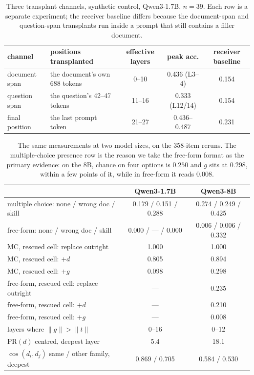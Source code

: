 \documentclass{article}
\newcommand{\dvec}{\ensuremath{d}}
\newcommand{\gvec}{\ensuremath{g}}
\newcommand{\tvec}{\ensuremath{t}}
\begin{document}
\begin{table}[t]
\caption{Three transplant channels, synthetic control, Qwen3-1.7B, $n=39$.
Each row is a separate experiment; the receiver baseline differs because the
document-span and question-span transplants run inside a prompt that still
contains a filler document.}
\label{tab:windows}
\centering
\small
\begin{tabular}{llccc}
\toprule
channel & positions transplanted & effective layers & peak acc. & receiver baseline \\
\midrule
document span & the document's own 688 tokens & 0--10 & 0.436 (L3--4) & 0.154 \\
question span & the question's 42--47 tokens  & 11--16 & 0.333 (L12/14) & 0.154 \\
final position & the last prompt token        & 21--27 & 0.436--0.487 & 0.231 \\
\bottomrule
\end{tabular}
\end{table}


\begin{table}[h]
\caption{The same measurements at two model sizes, on the $358$-item reruns.
The multiple-choice presence row is the reason we take the free-form format as
the primary evidence: on the 8B, chance on four options is $0.250$ and $\gvec$
sits at $0.298$, within a few points of it, while in free-form it reads
$0.008$.}
\label{tab:ladder}
\centering
\small
\begin{tabular}{lcc}
\toprule
 & Qwen3-1.7B & Qwen3-8B \\
\midrule
multiple choice: none / wrong doc / skill & 0.179 / 0.151 / 0.288 & 0.274 / 0.249 / 0.425 \\
free-form: none / wrong doc / skill       & 0.000 / --- / 0.000   & 0.006 / 0.006 / 0.332 \\
\midrule
MC, rescued cell: replace outright        & 1.000 & 1.000 \\
MC, rescued cell: $+\dvec$                & 0.805 & 0.894 \\
MC, rescued cell: $+\gvec$                & 0.098 & 0.298 \\
free-form, rescued cell: replace outright & ---   & 0.235 \\
free-form, rescued cell: $+\dvec$         & ---   & 0.210 \\
free-form, rescued cell: $+\gvec$         & ---   & 0.008 \\
\midrule
layers where $\|\gvec\| > \|\tvec\|$      & 0--16 & 0--12 \\
$\mathrm{PR}(\dvec)$ centred, deepest layer & 5.4 & 18.1 \\
$\cos(\dvec_i,\dvec_j)$ same / other family, deepest & 0.869 / 0.705 & 0.584 / 0.530 \\
\bottomrule
\end{tabular}
\end{table}
\end{document}
